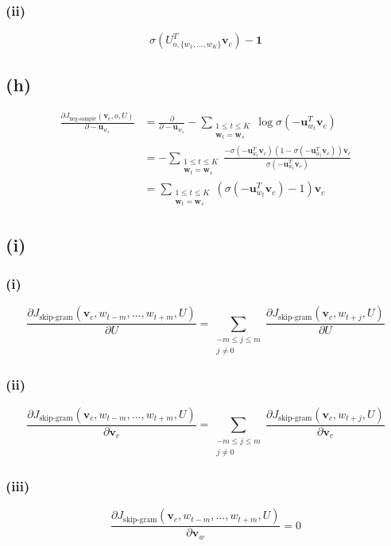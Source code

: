 \documentclass[12pt]{article}
\begin{document}
\subsubsection*{(ii)}
\begin{equation*}
    \sigma(U_{o,\{w_1,...,w_K\}}^T \pmb{v}_c) - \pmb{1}
\end{equation*}


\subsection*{(h)}
\begin{align*}
    \frac{\partial J_{\text{neg-sample}}(\pmb{v}_c, o, U)}{\partial -\pmb{u}_{w_s}} &= \frac{\partial}{\partial -\pmb{u}_{w_s}} - \sum_{\substack{1 \leq t \leq K \\ \pmb{w}_t = \pmb{w}_s}}{\log \sigma(-\pmb{u}_{w_t}^T \pmb{v}_c)}\\
    &= - \sum_{\substack{1 \leq t \leq K \\ \pmb{w}_t = \pmb{w}_s}}{\frac{-\sigma(-\pmb{u}_{w_t}^T \pmb{v}_c) (1 - \sigma(-\pmb{u}_{w_t}^T \pmb{v}_c)) \pmb{v}_c}{\sigma(-\pmb{u}_{w_t}^T \pmb{v}_c)}}\\
    &= \sum_{\substack{1 \leq t \leq K \\ \pmb{w}_t = \pmb{w}_s}}{(\sigma(-\pmb{u}_{w_t}^T \pmb{v}_c) - 1) \pmb{v}_c}
\end{align*}


\subsection*{(i)}

\subsubsection*{(i)}
\begin{equation*}
    \frac{\partial J_{\text{skip-gram}}(\pmb{v}_c, w_{t-m},..., w_{t+m}, U)}{\partial U} = \sum_{\substack{-m \leq j \leq m \\ j \neq 0}}{\frac{\partial J_{\text{skip-gram}}(\pmb{v}_c, w_{t+j}, U)}{\partial U}}
\end{equation*}

\subsubsection*{(ii)}
\begin{equation*}
    \frac{\partial J_{\text{skip-gram}}(\pmb{v}_c, w_{t-m},..., w_{t+m}, U)}{\partial \pmb{v}_c} = \sum_{\substack{-m \leq j \leq m \\ j \neq 0}}{\frac{\partial J_{\text{skip-gram}}(\pmb{v}_c, w_{t+j}, U)}{\partial \pmb{v}_c}}
\end{equation*}

\subsubsection*{(iii)}
\begin{equation*}
    \frac{\partial J_{\text{skip-gram}}(\pmb{v}_c, w_{t-m},..., w_{t+m}, U)}{\partial \pmb{v}_w} = 0
\end{equation*}
\end{document}
